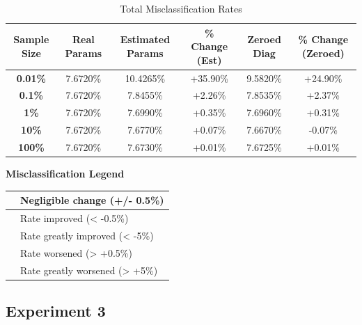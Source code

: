 \documentclass{article}
\begin{document}
\begin{table}[H]
\centering
\small
\caption{Total Misclassification Rates}
\vspace{0.5em}
\begin{tabular}{cccccc}
\toprule
\textbf{Sample Size} & \textbf{Real Params} & \textbf{Estimated Params} & \textbf{\% Change (Est)} & \textbf{Zeroed Diag} & \textbf{\% Change (Zeroed)} \\
\midrule
\textbf{0.01\%} & 7.6720\% & 10.4265\% & \cellcolor{greatworsened}\color{white} +35.90\% & 9.5820\% & \cellcolor{greatworsened}\color{white} +24.90\% \\
\textbf{0.1\%} & 7.6720\% & 7.8455\% & \cellcolor{worsened} +2.26\% & 7.8535\% & \cellcolor{worsened} +2.37\% \\
\textbf{1\%} & 7.6720\% & 7.6990\% & \cellcolor{negchange} +0.35\% & 7.6960\% & \cellcolor{negchange} +0.31\% \\
\textbf{10\%} & 7.6720\% & 7.6770\% & \cellcolor{negchange} +0.07\% & 7.6670\% & \cellcolor{negchange} -0.07\% \\
\textbf{100\%} & 7.6720\% & 7.6730\% & \cellcolor{negchange} +0.01\% & 7.6725\% & \cellcolor{negchange} +0.01\% \\
\bottomrule
\end{tabular}
\end{table}

\begin{center}
\textbf{Misclassification Legend} \\
\begin{tabular}{|l|l|}
\hline
\cellcolor{negchange} & Negligible change (+/- 0.5\%) \\ \hline
\cellcolor{improved} & Rate improved (< -0.5\%) \\ \hline
\cellcolor{greatimproved} & Rate greatly improved (< -5\%) \\ \hline
\cellcolor{worsened} & Rate worsened (> +0.5\%) \\ \hline
\cellcolor{greatworsened} & Rate greatly worsened (> +5\%) \\ \hline
\end{tabular}
\end{center}

\subsection{Experiment 3}\label{experiment-3-1}
\end{document}
